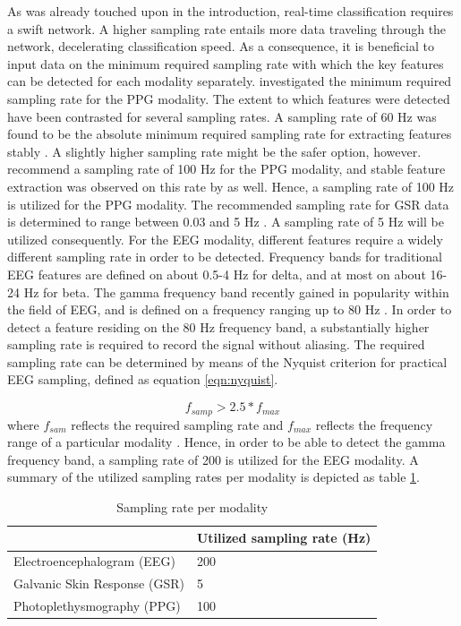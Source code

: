 \documentclass[12pt]{article}
\begin{document}
As was already touched upon in the introduction, real-time classification requires a swift network. A higher sampling rate entails more data traveling through the network, decelerating classification speed. As a consequence, it is beneficial to input data on the minimum required sampling rate with which the key features can be detected for each modality separately.  investigated the minimum required sampling rate for the PPG modality. The extent to which features were detected have been contrasted for several sampling rates. A sampling rate of 60 Hz was found to be the absolute minimum required sampling rate for extracting features stably \cite{fujita2019evaluation}. A slightly higher sampling rate might be the safer option, however.  recommend a sampling rate of 100 Hz for the PPG modality, and stable feature extraction was observed on this rate by  as well. Hence, a sampling rate of 100 Hz is utilized for the PPG modality. The recommended sampling rate for GSR data is determined to range between 0.03 and 5 Hz \cite{shimmer}. A sampling rate of 5 Hz will be utilized consequently. For the EEG modality, different features require a widely different sampling rate in order to be detected. Frequency bands for traditional EEG features are defined on about 0.5-4 Hz for delta, and at most on about 16-24 Hz for beta. The gamma frequency band recently gained in popularity within the field of EEG, and is defined on a frequency ranging up to 80 Hz \cite{weiergraeber2016sampling}. In order to detect a feature residing on the 80 Hz frequency band, a substantially higher sampling rate is required to record the signal without aliasing. The required sampling rate can be determined by means of the Nyquist criterion for practical EEG sampling, defined as equation \ref{eqn:nyquist}.

\begin{equation}
\label{eqn:nyquist}
f_{samp} > 2.5 * f_{max}
\end{equation}
where $f_{sam}$ reflects the required sampling rate and $f_{max}$ reflects the frequency range of a particular modality \cite{srinivasan1998estimating}. Hence, in order to be able to detect the gamma frequency band, a sampling rate of 200 is utilized for the EEG modality. A summary of the utilized sampling rates per modality is depicted as table \ref{table:samplingrate}.

\bgroup
\def\arraystretch{1.6}%
\begin{table}[h]
\centering
\caption{Sampling rate per modality}
\label{table:samplingrate}
\begin{tabular}{ll}
    & Utilized sampling rate (Hz) \\ \hline
 Electroencephalogram (EEG) & 200                         \\
Galvanic Skin Response (GSR) & 5                           \\
Photoplethysmography (PPG) & 100                         \\ \hline
\end{tabular}
\end{table}
\egroup
\end{document}
